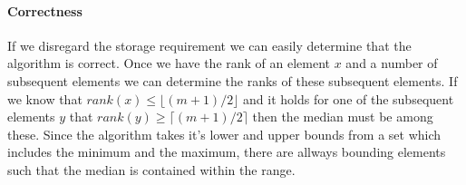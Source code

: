\paragraph{Correctness}
If we disregard the storage requirement we can easily determine that the algorithm is correct. Once we have the rank of an element $x$ and a number of subsequent elements we can determine the ranks of these subsequent elements. If we know that $\textit{rank}(x) \leq \lfloor (m+1)/2 \rfloor$ and it holds for one of the subsequent elements $y$ that $\textit{rank}(y) \geq \lceil (m+1)/2 \rceil$ then the median must be among these. Since the algorithm takes it's lower and upper bounds from a set which includes the minimum and the maximum, there are allways bounding elements such that the median is contained within the range.